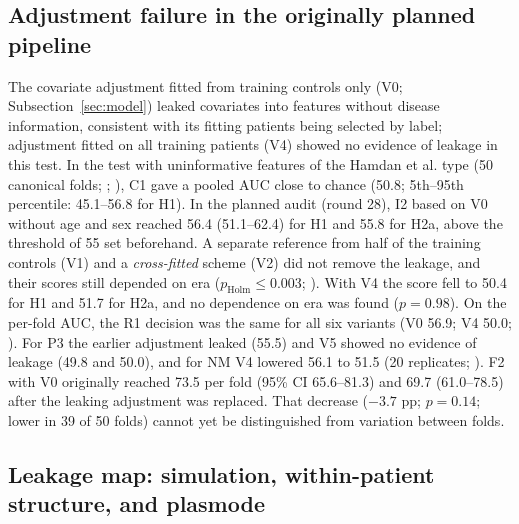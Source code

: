 

\subsection{Adjustment failure in the originally planned pipeline}\label{sec:kebocoran}

The covariate adjustment fitted from training controls only (V0; Subsection~\ref{sec:model}) leaked covariates into features without disease information, consistent with its fitting patients being selected by label; adjustment fitted on all training patients (V4) showed no evidence of leakage in this test.
In the test with uninformative features of the Hamdan et al. type \cite{hamdan2023} (50 canonical folds; ; ), C1 gave a pooled AUC close to chance (50.8; 5th--95th percentile: 45.1--56.8 for H1). In the planned audit (round 28), I2 based on V0 without age and sex reached 56.4 (51.1--62.4) for H1 and 55.8 for H2a, above the threshold of 55 set beforehand.
A separate reference from half of the training controls (V1) and a \textit{cross-fitted} scheme (V2) did not remove the leakage, and their scores still depended on era ($p_{\mathrm{Holm}} \leq 0.003$; ). With V4 the score fell to 50.4 for H1 and 51.7 for H2a, and no dependence on era was found ($p = 0.98$). On the per-fold AUC, the R1 decision was the same for all six variants (V0 56.9; V4 50.0; ).
For P3 the earlier adjustment leaked (55.5) and V5 showed no evidence of leakage (49.8 and 50.0), and for NM V4 lowered 56.1 to 51.5 (20 replicates; ).
F2 with V0 originally reached 73.5 per fold (95\% CI 65.6--81.3) and 69.7 (61.0--78.5) after the leaking adjustment was replaced.
That decrease ($-3.7$ pp; $p = 0.14$; lower in 39 of 50 folds) cannot yet be distinguished from variation between folds.



\subsection{Leakage map: simulation, within-patient structure, and plasmode}\label{sec:peta}

